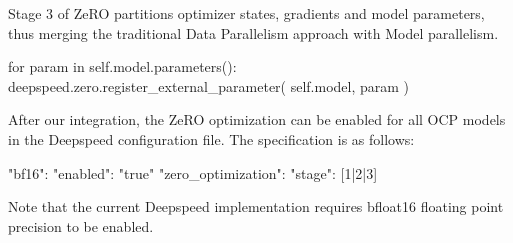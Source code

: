 Stage 3 of ZeRO partitions optimizer states, gradients and model parameters, thus merging the 
traditional Data Parallelism approach with Model parallelism.

\begin{python}
for param in self.model.parameters():
    deepspeed.zero.register_external_parameter(
        self.model, param
    )
\end{python}

After our integration, the ZeRO optimization can be enabled for all OCP models in the Deepspeed configuration 
file. The specification is as follows:

\begin{json}
{
    "bf16": {
        "enabled": "true"
    }
    "zero_optimization": {
        "stage": [1|2|3]
    }
}
\end{json}

Note that the current Deepspeed implementation requires bfloat16 floating point precision to be enabled. 
